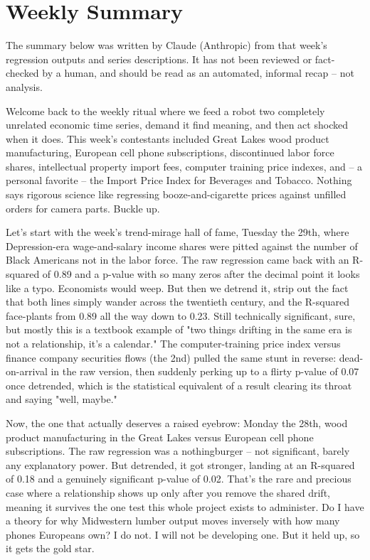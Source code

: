 \section{Weekly Summary}

\begin{tcolorbox}[colback=yellow!10,colframe=black!50,title=AI-Generated Content]
\noindent The summary below was written by Claude (Anthropic) from that week's regression outputs and series descriptions. It has not been reviewed or fact-checked by a human, and should be read as an automated, informal recap -- not analysis.
\end{tcolorbox}

Welcome back to the weekly ritual where we feed a robot two completely unrelated economic time series, demand it find meaning, and then act shocked when it does. This week's contestants included Great Lakes wood product manufacturing, European cell phone subscriptions, discontinued labor force shares, intellectual property import fees, computer training price indexes, and -- a personal favorite -- the Import Price Index for Beverages and Tobacco. Nothing says rigorous science like regressing booze-and-cigarette prices against unfilled orders for camera parts. Buckle up.

Let's start with the week's trend-mirage hall of fame, Tuesday the 29th, where Depression-era wage-and-salary income shares were pitted against the number of Black Americans not in the labor force. The raw regression came back with an R-squared of 0.89 and a p-value with so many zeros after the decimal point it looks like a typo. Economists would weep. But then we detrend it, strip out the fact that both lines simply wander across the twentieth century, and the R-squared face-plants from 0.89 all the way down to 0.23. Still technically significant, sure, but mostly this is a textbook example of "two things drifting in the same era is not a relationship, it's a calendar." The computer-training price index versus finance company securities flows (the 2nd) pulled the same stunt in reverse: dead-on-arrival in the raw version, then suddenly perking up to a flirty p-value of 0.07 once detrended, which is the statistical equivalent of a result clearing its throat and saying "well, maybe."

Now, the one that actually deserves a raised eyebrow: Monday the 28th, wood product manufacturing in the Great Lakes versus European cell phone subscriptions. The raw regression was a nothingburger -- not significant, barely any explanatory power. But detrended, it got stronger, landing at an R-squared of 0.18 and a genuinely significant p-value of 0.02. That's the rare and precious case where a relationship shows up only after you remove the shared drift, meaning it survives the one test this whole project exists to administer. Do I have a theory for why Midwestern lumber output moves inversely with how many phones Europeans own? I do not. I will not be developing one. But it held up, so it gets the gold star.

